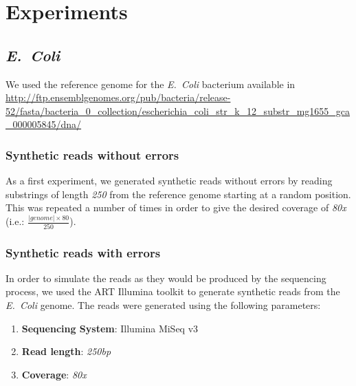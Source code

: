 \section{Experiments}

\subsection{\emph{E.~Coli}}

We used the reference genome for the \emph{E.~Coli} bacterium available in \url{http://ftp.ensemblgenomes.org/pub/bacteria/release-52/fasta/bacteria_0_collection/escherichia_coli_str_k_12_substr_mg1655_gca_000005845/dna/}

\subsubsection{Synthetic reads without errors}

As a first experiment, we generated synthetic reads without errors by reading substrings of length \textit{250} from the reference genome starting at
a random position. This was repeated a number of times in order to give the desired coverage of \textit{80x} (i.e.: $\frac{|\mathit{genome}| \times 80}{250}$).

\subsubsection{Synthetic reads with errors}

In order to simulate the reads as they would be produced by the sequencing process, we used the ART Illumina toolkit to generate
synthetic reads from the \emph{E.~Coli} genome. The reads were generated using the following parameters:

\begin{enumerate}
\item \textbf{Sequencing System}: Illumina MiSeq v3
\item \textbf{Read length}: \textit{250bp}
\item \textbf{Coverage}: \textit{80x}
\end{enumerate}